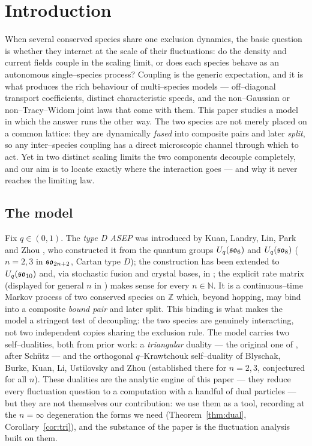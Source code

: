 \documentclass[11pt]{article}
\theoremstyle{plain}
\theoremstyle{definition}
\theoremstyle{remark}
\newcommand{\Z}{\mathbb{Z}}\newcommand{\R}{\mathbb{R}}\newcommand{\N}{\mathbb{N}}
\begin{document}
{\small\tableofcontents}

\section{Introduction}\label{sec:intro}

When several conserved species share one exclusion dynamics, the basic question is
whether they interact at the scale of their fluctuations: do the density and current
fields couple in the scaling limit, or does each species behave as an autonomous
single--species process? Coupling is the generic expectation, and it is what produces
the rich behaviour of multi--species models --- off--diagonal transport coefficients,
distinct characteristic speeds, and the non--Gaussian or non--Tracy--Widom joint laws
that come with them. This paper studies a model in which the answer runs the other way.
The two species are not merely placed on a common lattice: they are dynamically
\emph{fused} into composite pairs and later \emph{split}, so any inter--species
coupling has a direct microscopic channel through which to act. Yet in two distinct
scaling limits the two components decouple completely, and our aim is to locate exactly
where the interaction goes --- and why it never reaches the limiting law.

\subsection{The model}\label{sec:intromodel}
Fix $q\in(0,1)$. The \emph{type D ASEP} was introduced by Kuan, Landry, Lin, Park and
Zhou \cite{KLLPZ}, who constructed it from the quantum groups $U_q(\mathfrak{so}_6)$ and
$U_q(\mathfrak{so}_8)$ ($n=2,3$ in $\mathfrak{so}_{2n+2}$, Cartan type $D$); the construction has been
extended to $U_q(\mathfrak{so}_{10})$ \cite{RSL} and, via stochastic fusion and crystal bases, in
\cite{BEPS}; the explicit rate matrix (displayed for general $n$ in \cite[\S2.1]{REU})
makes sense for every $n\in\N$. It is a
continuous--time Markov process of two conserved species on $\Z$ which, beyond
hopping, may bind into a composite \emph{bound pair} and later split. This binding is
what makes the model a stringent test of decoupling: the two species are genuinely
interacting, not two independent copies sharing the exclusion rule. The model carries
two self--dualities, both from prior work: a \emph{triangular} duality --- the
original one of \cite{KLLPZ}, after Sch\"utz \cite{SchutzDual} --- and the orthogonal
$q$--Krawtchouk self--duality of Blyschak, Burke, Kuan, Li, Ustilovsky and Zhou
\cite{REU} (established there for $n=2,3$, conjectured for all $n$). These dualities
are the analytic engine of this paper --- they reduce every fluctuation question to a
computation with a handful of dual particles --- but they are not themselves our
contribution: we use them as a tool, recording at the $n=\infty$ degeneration the
forms we need (Theorem~\ref{thm:dual}, Corollary~\ref{cor:tri}), and the substance of
the paper is the fluctuation analysis built on them.
\end{document}
